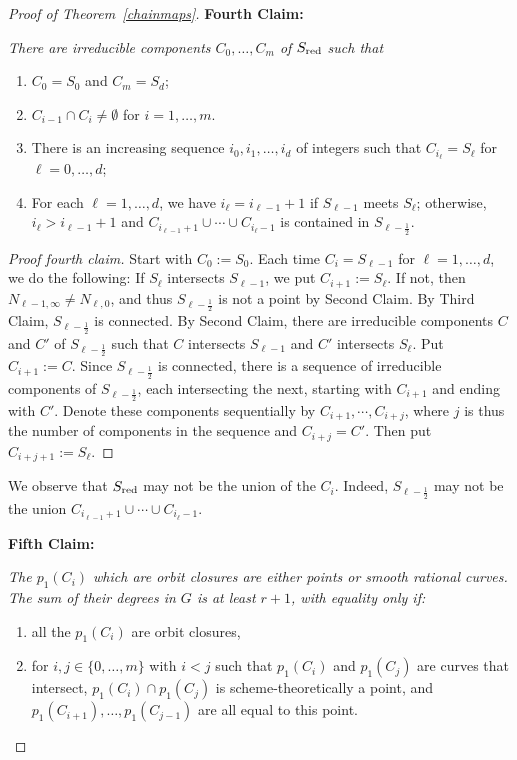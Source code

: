 \documentclass[a4paper,11pt]{amsart}
\theoremstyle{plain}
\theoremstyle{definition}
\theoremstyle{remark}
\def\red{\text{\rm red}}
\begin{document}
\begin{proof}[Proof of Theorem~\ref{chainmaps}]
{\bf Fourth Claim:} {\it There are irreducible components $C_0,\dots,C_m$ of $S_\red$ such that
\begin{enumerate} 
\item $C_0=S_0$ and $C_m=S_d$;
\item $C_{i-1}\cap C_i\neq\emptyset$ for $i=1,\dots,m$. 
\item There is an increasing sequence $i_0,i_1,\dots,i_d$ of integers such that $C_{i_\ell}=S_\ell$ for $\ell=0,\dots,d$;
\item For each $\ell=1,\dots,d$, we have $i_{\ell}=i_{\ell-1}+1$ if $S_{\ell-1}$ meets $S_\ell$; otherwise, $i_{\ell}>i_{\ell-1}+1$ and $C_{i_{\ell-1}+1}\cup\cdots\cup C_{i_{\ell}-1}$ is contained in $S_{\ell-\frac{1}{2}}$.
\end{enumerate}}

\begin{proof}[Proof fourth claim]
Start with $C_0:=S_0$. Each time $C_i=S_{\ell-1}$ for $\ell=1,\dots,d$, we do the following: If $S_{\ell}$ intersects $S_{\ell-1}$, we put $C_{i+1}:=S_\ell$. If not, then $N_{\ell-1,\infty}\neq N_{\ell,0}$, and thus $S_{\ell-\frac{1}{2}}$ is not a point by Second Claim. By Third Claim, $S_{\ell-\frac{1}{2}}$ is connected. By Second Claim, there are irreducible components $C$ and $C'$ of $S_{\ell-\frac{1}{2}}$ such that $C$ intersects $S_{\ell-1}$ and $C'$ intersects $S_\ell$. Put $C_{i+1}:=C$. Since $S_{\ell-\frac{1}{2}}$ is connected, there is a sequence of irreducible components of $S_{\ell-\frac{1}{2}}$, each intersecting the next, starting with $C_{i+1}$ and ending with $C'$. Denote these components sequentially by $C_{i+1},\cdots,C_{i+j}$, where $j$ is thus the number of components in the sequence and $C_{i+j}=C'$. Then put $C_{i+j+1}:=S_{\ell}$.
\end{proof} 

We observe that $S_\red$ may not be the union of the $C_i$. Indeed, 
$S_{\ell-\frac{1}{2}}$ may not be the union $C_{i_{\ell-1}+1}\cup\cdots\cup C_{i_{\ell}-1}$.

\vskip0.2cm

{\bf Fifth Claim:} {\it The $p_1(C_i)$ which are orbit closures are either points or smooth rational curves. The sum of their degrees in $G$ is at least $r+1$, with equality only if:
\begin{enumerate}
    \item all the $p_1(C_i)$ are orbit closures, 
    \item for $i,j\in\{0,\dots,m\}$ with $i<j$ such that $p_1(C_i)$ and $p_1(C_j)$ are curves that intersect, $p_1(C_i)\cap p_1(C_j)$ is scheme-theoretically a point, and $p_1(C_{i+1}),\dots,p_1(C_{j-1})$ are all equal to this point.
\end{enumerate}}


\end{proof}
\end{document}
